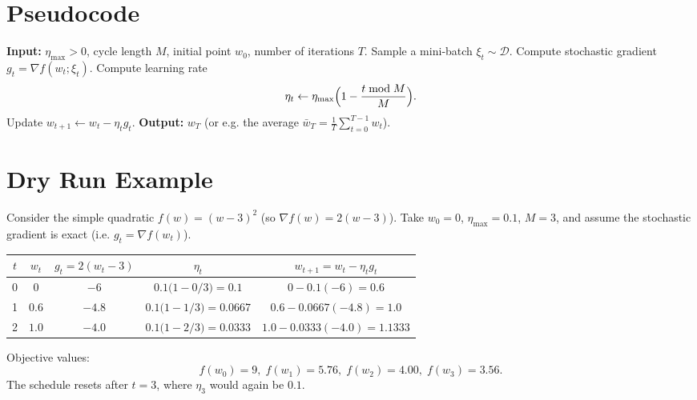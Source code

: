 \documentclass{article}
\begin{document}
\section*{Pseudocode}
\begin{algorithm}[H]
\caption{SGDR}
\begin{algorithmic}[1]
\State \textbf{Input:} $\eta_{\max}>0$, cycle length $M$, initial point $w_0$,
        number of iterations $T$.
    \State Sample a mini‑batch $\xi_t\sim\mathcal{D}$.
    \State Compute stochastic gradient $g_t=\nabla f(w_t;\xi_t)$.
    \State Compute learning rate 
    \[
        \eta_t\gets\eta_{\max}\Bigl(1-\frac{t\bmod M}{M}\Bigr).
    \] 
    \State Update $w_{t+1}\gets w_t-\eta_t g_t$.
\EndFor
\State \textbf{Output:} $w_T$ (or e.g. the average $\bar w_T=\frac1T\sum_{t=0}^{T-1}w_t$).
\end{algorithmic}
\end{algorithm}

\section*{Dry Run Example}
Consider the simple quadratic $f(w)=(w-3)^2$ (so $\nabla f(w)=2(w-3)$).  
Take $w_0=0$, $\eta_{\max}=0.1$, $M=3$, and assume the stochastic gradient is exact (i.e. $g_t=\nabla f(w_t)$).

\begin{center}
\begin{tabular}{c|c|c|c|c}
$t$ & $w_t$ & $g_t=2(w_t-3)$ & $\eta_t$ & $w_{t+1}=w_t-\eta_t g_t$ \\ \hline
0 & $0$   & $-6$  & $0.1\bigl(1-0/3\bigr)=0.1$ & $0-0.1(-6)=0.6$ \\
1 & $0.6$ & $-4.8$& $0.1\bigl(1-1/3\bigr)=0.0667$ & $0.6-0.0667(-4.8)=1.0$ \\
2 & $1.0$ & $-4.0$& $0.1\bigl(1-2/3\bigr)=0.0333$ & $1.0-0.0333(-4.0)=1.1333$ \\
\end{tabular}
\end{center}
Objective values:
\[
f(w_0)=9,\; f(w_1)=5.76,\; f(w_2)=4.00,\; f(w_3)=3.56.
\]
The schedule resets after $t=3$, where $\eta_3$ would again be $0.1$.

\end{document}
